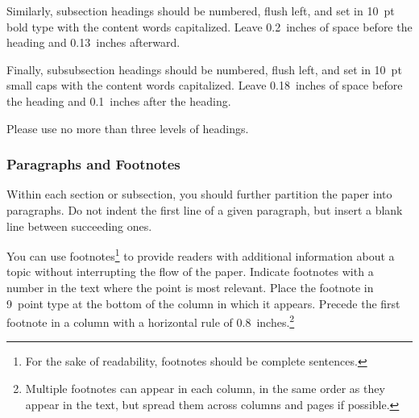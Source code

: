 \documentclass{article}
\begin{document}
Similarly, subsection headings should be numbered, flush left, and set
in 10~pt bold type with the content words capitalized. Leave
0.2~inches of space before the heading and 0.13~inches afterward.

Finally, subsubsection headings should be numbered, flush left, and
set in 10~pt small caps with the content words capitalized. Leave
0.18~inches of space before the heading and 0.1~inches after the
heading. 

Please use no more than three levels of headings.

\subsubsection{Paragraphs and Footnotes}

Within each section or subsection, you should further partition the
paper into paragraphs. Do not indent the first line of a given
paragraph, but insert a blank line between succeeding ones.
 
You can use footnotes\footnote{For the sake of readability, footnotes
should be complete sentences.} to provide readers with additional
information about a topic without interrupting the flow of the paper. 
Indicate footnotes with a number in the text where the point is most
relevant. Place the footnote in 9~point type at the bottom of the
column in which it appears. Precede the first footnote in a column
with a horizontal rule of 0.8~inches.\footnote{Multiple footnotes can
appear in each column, in the same order as they appear in the text,
but spread them across columns and pages if possible.}
\end{document}
